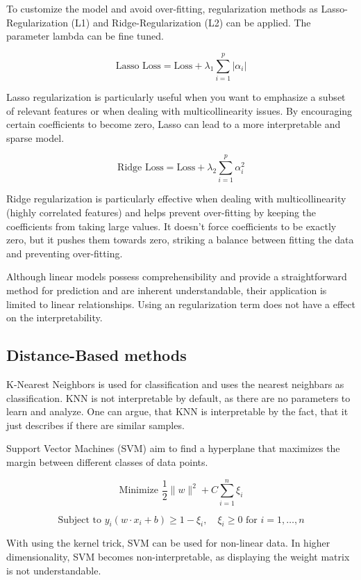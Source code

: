 To customize the model and avoid over-fitting, regularization methods as Lasso-Regularization (L1) and Ridge-Regularization (L2) can be applied. The parameter lambda can be fine tuned.

$$\text{Lasso Loss} = \text{Loss} + \lambda_1 \sum_{i=1}^{p} |{\alpha}_i|$$

Lasso regularization is particularly useful when you want to emphasize a subset of relevant features or when dealing with multicollinearity issues. By encouraging certain coefficients to become zero, Lasso can lead to a more interpretable and sparse model.

$$\text{Ridge Loss} = \text{Loss} + \lambda_2 \sum_{i=1}^{p} {\alpha}_i^2$$

Ridge regularization is particularly effective when dealing with multicollinearity (highly correlated features) and helps prevent over-fitting by keeping the coefficients from taking large values. It doesn't force coefficients to be exactly zero, but it pushes them towards zero, striking a balance between fitting the data and preventing over-fitting.

Although linear models possess comprehensibility and provide a straightforward method for prediction and are inherent understandable, their application is limited to linear relationships. Using an regularization term does not have a effect on the interpretability.


\subsection{Distance-Based methods}
K-Nearest Neighbors is used for classification and uses the nearest neighbars as classification. KNN is not interpretable by default, as there are no parameters to learn and analyze. One can argue, that KNN is interpretable by the fact, that it just describes if there are similar samples. 

Support Vector Machines (SVM) aim to find a hyperplane that maximizes the margin between different classes of data points.

$$\text{Minimize } \frac{1}{2} \|w\|^2 + C \sum_{i=1}^{n} \xi_i$$

$$\text{Subject to } y_i (w \cdot x_i + b) \geq 1 - \xi_i, \quad \xi_i \geq 0 \text{ for } i = 1, \ldots, n$$

With using the kernel trick, SVM can be used for non-linear data. In higher dimensionality, SVM becomes non-interpretable, as displaying the weight matrix is not understandable.


